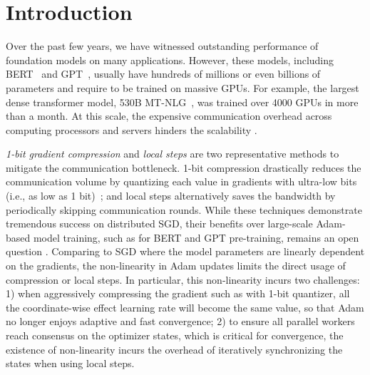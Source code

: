\section{Introduction}
\label{sec:intro}
Over the past few years, we have witnessed outstanding performance of foundation models on many applications. However, these models, including BERT~\cite{devlin2018bert} and GPT~\cite{gpt-2,gpt-3}, usually have hundreds of millions or even billions of parameters and require to be trained on massive GPUs. For example, the largest dense transformer model, 530B MT-NLG~\cite{mt-nlg}, was trained over 4000 GPUs in more than a month. At this scale, the expensive communication overhead across computing processors and servers hinders the scalability \citep{alistarh2017qsgd}.

\emph{1-bit gradient compression} and \emph{local steps} are two representative methods to mitigate the communication bottleneck. 1-bit compression drastically reduces the communication volume by quantizing each value in gradients with ultra-low bits (i.e., as low as 1 bit)~\cite{seide20141,bernstein2018signsgd}; and local steps alternatively saves the bandwidth by periodically skipping communication rounds\citep{stich2018local}.
While these techniques demonstrate tremendous success on distributed SGD, their benefits over large-scale Adam-based model training, such as for BERT and GPT pre-training, remains an open question \citep{kingma2014adam,wang2019signadam++}.
Comparing to SGD where the model parameters are linearly dependent on the gradients, the non-linearity in Adam updates \citep{kingma2014adam} limits the direct usage of compression or local steps.
In particular, this non-linearity incurs two challenges: 1) when aggressively compressing the gradient such as with 1-bit quantizer, all the coordinate-wise effect learning rate will become the same value, so that Adam no longer enjoys adaptive and fast convergence; 2) to ensure all parallel workers reach consensus on the optimizer states, which is critical for convergence, the existence of non-linearity incurs the overhead of iteratively synchronizing the states when using local steps.

